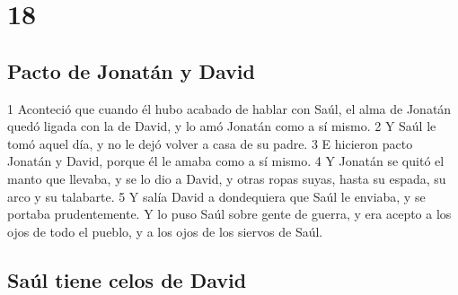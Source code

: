 \chapter{18}

\section*{Pacto de Jonatán y David}

1 Aconteció que cuando él hubo acabado de hablar con Saúl, el alma de Jonatán quedó ligada con la de David, y lo amó Jonatán como a sí mismo.
2 Y Saúl le tomó aquel día, y no le dejó volver a casa de su padre.
3 E hicieron pacto Jonatán y David, porque él le amaba como a sí mismo.
4 Y Jonatán se quitó el manto que llevaba, y se lo dio a David, y otras ropas suyas, hasta su espada, su arco y su talabarte.
5 Y salía David a dondequiera que Saúl le enviaba, y se portaba prudentemente. Y lo puso Saúl sobre gente de guerra, y era acepto a los ojos de todo el pueblo, y a los ojos de los siervos de Saúl.

\section*{Saúl tiene celos de David}

